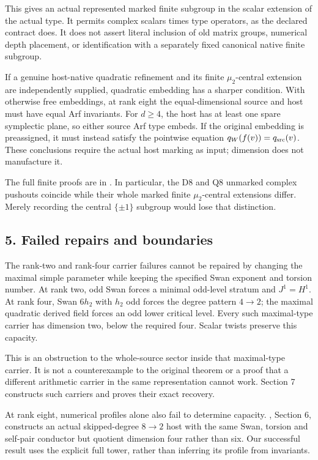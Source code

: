 This gives an actual represented marked finite subgroup in the scalar
extension of the actual type. It permits complex scalars times type
operators, as the declared contract does. It does not assert literal
inclusion of old matrix groups, numerical depth placement, or
identification with a separately fixed canonical native finite subgroup.

If a genuine host-native quadratic refinement and its finite
\(\mu_2\)-central extension are independently supplied, quadratic
embedding has a sharper condition. With otherwise free embeddings, at
rank eight the equal-dimensional source and host must have equal Arf
invariants. For \(d\ge4\), the host has at least one spare symplectic
plane, so either source Arf type embeds. If the original embedding is
preassigned, it must instead satisfy the pointwise equation
\(q_W(f(v))=q_{\rm src}(v)\). These conclusions require the actual host
marking as input; dimension does not manufacture it.

The full finite proofs are in .
In particular, the D8 and Q8 unmarked complex pushouts coincide while
their whole marked finite \(\mu_2\)-central extensions differ. Merely
recording the central \(\{\pm1\}\) subgroup would lose that distinction.

\hypertarget{dyadic_synthesis-failed-repairs-and-boundaries}{%
\subsection{5. Failed repairs and
boundaries}\label{dyadic_synthesis-failed-repairs-and-boundaries}}

The rank-two and rank-four carrier failures cannot be repaired by
changing the maximal simple parameter while keeping the specified Swan
exponent and torsion number. At rank two, odd Swan forces a minimal
odd-level stratum and \(J^1=H^1\). At rank four, Swan \(6h_2\) with
\(h_2\) odd forces the degree pattern \(4\to2\); the maximal quadratic
derived field forces an odd lower critical level. Every such
maximal-type carrier has dimension two, below the required four. Scalar
twists preserve this capacity.

This is an obstruction to the whole-source sector inside that
maximal-type carrier. It is not a counterexample to the original theorem
or a proof that a different arithmetic carrier in the same
representation cannot work. Section 7 constructs such carriers and
proves their exact recovery.

At rank eight, numerical profiles alone also fail to determine capacity.
, Section 6, constructs an
actual skipped-degree \(8\to2\) host with the same Swan, torsion and
self-pair conductor but quotient dimension four rather than six. Our
successful result uses the explicit full tower, rather than inferring
its profile from invariants.

